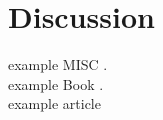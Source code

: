 
\section{Discussion}
example MISC \cite{exampleMISC}.\\
example Book \cite{exampleBOOK}.\\
example article \cite[p.~5]{exampleARTICLE}